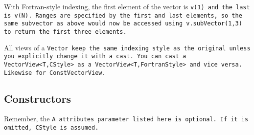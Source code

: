 With Fortran-style indexing, the first element of the vector is \tt{v(1)} and the 
last is \tt{v(N)}.  Ranges are specified by the first and last elements, so the same
subvector as above would now be accessed using \tt{v.subVector(1,3)} to return
the first three elements.

All views of a \tt{Vector} keep the same indexing style as the original unless you
explicitly change it with a cast.  You can cast a \tt{VectorView<T,CStyle>} as
a \tt{VectorView<T,FortranStyle>} and vice versa.  Likewise for
\tt{ConstVectorView}.  

\subsection{Constructors}
\label{Vector_Constructors}

Remember, the \tt{A} attributes parameter listed here is optional.  If it is omitted, \tt{CStyle} is assumed.


